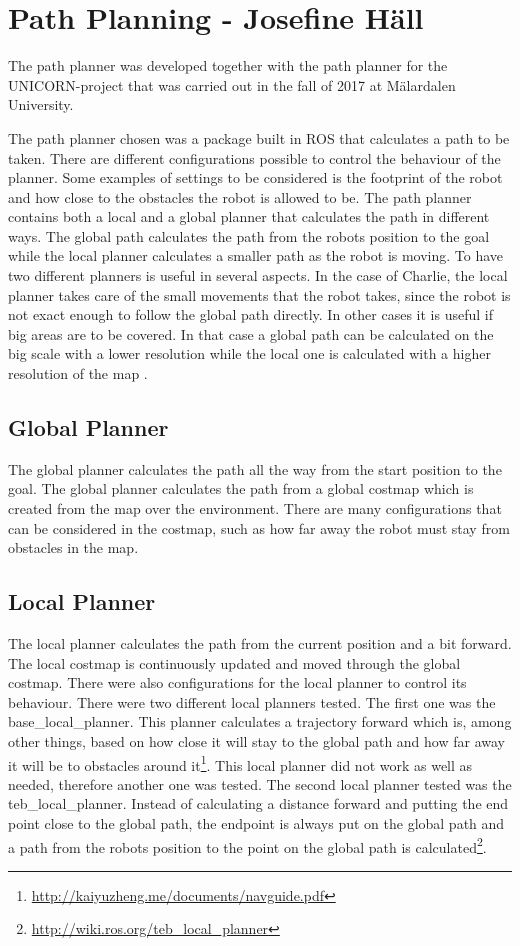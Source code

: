 \section{Path Planning - Josefine Häll}

The path planner was developed together with the path planner for the UNICORN-project that was carried out in the fall of 2017 at Mälardalen University. 

The path planner chosen was a package built in ROS that calculates a path to be taken. There are different configurations possible to control the behaviour of the planner. Some examples of settings to be considered is the footprint of the robot and how close to the obstacles the robot is allowed to be. The path planner contains both a local and a global planner that calculates the path in different ways. The global path calculates the path from the robots position to the goal while the local planner calculates a smaller path as the robot is moving. To have two different planners is useful in several aspects. In the case of Charlie, the local planner takes care of the small movements that the robot takes, since the robot is not exact enough to follow the global path directly. In other cases it is useful if big areas are to be covered. In that case a global path can be calculated on the big scale with a lower resolution while the local one is calculated with a higher resolution of the map \cite{shamsudin2017two}.

\subsection{Global Planner}
The global planner calculates the path all the way from the start position to the goal. The global planner calculates the path from a global costmap which is created from the map over the environment. There are many configurations that can be considered in the costmap, such as how far away the robot must stay from obstacles in the map.

\subsection{Local Planner}
The local planner calculates the path from the current position and a bit forward. The local costmap is continuously updated and moved through the global costmap. There were also configurations for the local planner to control its behaviour. There were two different local planners tested. The first one was the base\_local\_planner. This planner calculates a trajectory forward which is, among other things, based on how close it will stay to the global path and how far away it will be to obstacles around it\footnote{\url{http://kaiyuzheng.me/documents/navguide.pdf}}. This local planner did not work as well as needed, therefore another one was tested. The second local planner tested was the teb\_local\_planner. Instead of calculating a distance forward and putting the end point close to the global path, the endpoint is always put on the global path and a path from the robots position to the point on the global path is calculated\footnote{\url{http://wiki.ros.org/teb_local_planner}}. 


